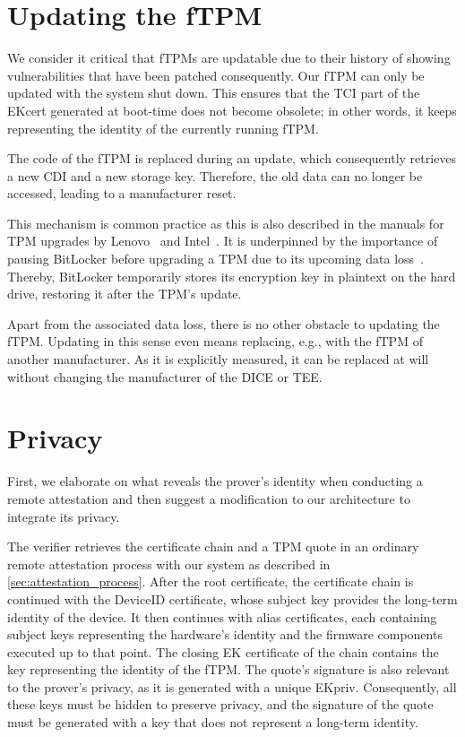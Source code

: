 \section{Updating the fTPM}

We consider it critical that \acp{fTPM} are updatable due to their history of showing vulnerabilities that have been patched consequently.
Our \ac{fTPM} can only be updated with the system shut down.
This ensures that the TCI part of the EKcert generated at boot-time does not become obsolete; in other words, it keeps representing the identity of the currently running fTPM\@.

The code of the fTPM is replaced during an update, which consequently retrieves a new CDI and a new storage key.
Therefore, the old data can no longer be accessed, leading to a manufacturer reset.

This mechanism is common practice as this is also described in the manuals for TPM upgrades by Lenovo~\cite{LenovoTpmUpgrade} and Intel~\cite{intelTpmUpgrade}. 
It is underpinned by the importance of pausing BitLocker before upgrading a TPM due to its upcoming data loss~\cite{BitlockerTpmUpgrade}.
Thereby, BitLocker temporarily stores its encryption key in plaintext on the hard drive, restoring it after the TPM's update.

Apart from the associated data loss, there is no other obstacle to updating the \ac{fTPM}\@.
Updating in this sense even means replacing, e.g., with the fTPM of another manufacturer.
As it is explicitly measured, it can be replaced at will without changing the manufacturer of the \ac{DICE} or \ac{TEE}\@.

\section{Privacy}\label{sec:privacy}

First, we elaborate on what reveals the prover's identity when conducting a remote attestation and then suggest a modification to our architecture to integrate its privacy.

The verifier retrieves the certificate chain and a TPM quote in an ordinary remote attestation process with our system as described in \autoref{sec:attestation_process}.
After the root certificate, the certificate chain is continued with the DeviceID certificate, whose subject key provides the long-term identity of the device.
It then continues with alias certificates, each containing subject keys representing the hardware's identity and the firmware components executed up to that point.
The closing EK certificate of the chain contains the key representing the identity of the fTPM\@.
The quote's signature is also relevant to the prover's privacy, as it is generated with a unique EKpriv.
Consequently, all these keys must be hidden to preserve privacy, and the signature of the quote must be generated with a key that does not represent a long-term identity.

